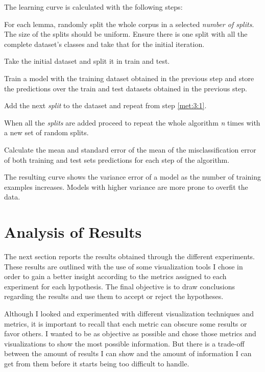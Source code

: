 \begin{metric}\label{met:3}
  The learning curve is calculated with the following steps:
  \begin{enummet}
    \item For each lemma, randomly split the whole corpus in a selected {\em
      number of splits}. The size of the splits should be uniform. Ensure there
      is one split with all the complete dataset's classes and take that for
      the initial iteration.
    \item \label{met:3:1} Take the initial dataset and split it in
      train and test.
    \item Train a model with the training dataset obtained in the previous step
      and store the predictions over the train and test datasets obtained in
      the previous step.
    \item Add the next {\em split} to the dataset and repeat from step
      \ref{met:3:1}.
    \item When all the {\em splits} are added proceed to repeat the whole
      algorithm {\em n} times with a new set of random splits.
    \item Calculate the mean and standard error of the mean of the
      misclassification error of both training and test sets predictions for
      each step of the algorithm.
  \end{enummet}
\end{metric}

The resulting curve shows the variance error of a model as the number of
training examples increases. Models with higher variance are more prone to
overfit the data. 

\section{Analysis of Results}\label{sec:supervised:results}

The next section reports the results obtained through the different
experiments.  These results are outlined with the use of some visualization
tools I chose in order to gain a better insight according to the metrics
assigned to each experiment for each hypothesis. The final objective is to draw
conclusions regarding the results and use them to accept or reject the
hypotheses.

Although I looked and experimented with different visualization techniques and
metrics, it is important to recall that each metric can obscure some results or
favor others. I wanted to be as objective as possible and chose those metrics
and visualizations to show the most possible information. But there is a
trade-off between the amount of results I can show and the amount of
information I can get from them before it starts being too difficult to handle.

